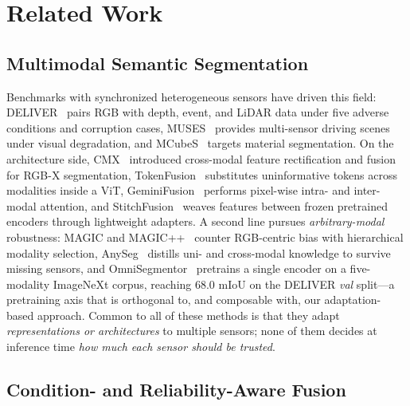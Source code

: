 
\section{Related Work}
\label{sec:related}

\subsection{Multimodal Semantic Segmentation}
\label{sec:related:mmss}

Benchmarks with synchronized heterogeneous sensors have driven this field: DELIVER~\cite{cmnext2023} pairs RGB with depth, event, and LiDAR data under five adverse conditions and corruption cases, MUSES~\cite{muses2024} provides multi-sensor driving scenes under visual degradation, and MCubeS~\cite{mcubes2022} targets material segmentation. On the architecture side, CMX~\cite{cmx2023} introduced cross-modal feature rectification and fusion for RGB-X segmentation, TokenFusion~\cite{tokenfusion2022} substitutes uninformative tokens across modalities inside a ViT, GeminiFusion~\cite{geminifusion2024} performs pixel-wise intra- and inter-modal attention, and StitchFusion~\cite{stitchfusion2024} weaves features between frozen pretrained encoders through lightweight adapters. A second line pursues \emph{arbitrary-modal} robustness: MAGIC and MAGIC++~\cite{magic2024,magicpp2024} counter RGB-centric bias with hierarchical modality selection, AnySeg~\cite{anyseg2024} distills uni- and cross-modal knowledge to survive missing sensors, and OmniSegmentor~\cite{omnisegmentor2025} pretrains a single encoder on a five-modality ImageNeXt corpus, reaching 68.0 mIoU on the DELIVER \emph{val} split---a pretraining axis that is orthogonal to, and composable with, our adaptation-based approach. Common to all of these methods is that they adapt \emph{representations or architectures} to multiple sensors; none of them decides at inference time \emph{how much each sensor should be trusted}.

\subsection{Condition- and Reliability-Aware Fusion}
\label{sec:related:reliability}

